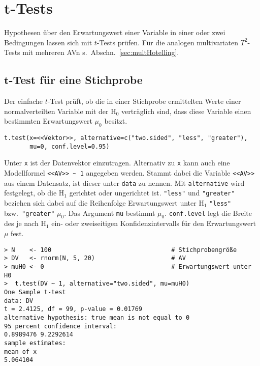 \section[\texorpdfstring{$t$}{t}-Tests]{$\bm{t}$-Tests}
\label{sec:tTest}

Hypothesen über den Erwartungswert einer Variable in einer oder zwei Bedingungen lassen sich mit $t$-Tests prüfen. Für die analogen multivariaten $T^{2}$-Tests mit mehreren AVn s.\ Abschn.\ \ref{sec:multHotelling}.

\subsection[\texorpdfstring{$t$}{t}-Test für eine Stichprobe]{$\bm{t}$-Test für eine Stichprobe}
\label{sec:tOne}

Der einfache $t$-Test prüft, ob die in einer Stichprobe ermittelten Werte einer normalverteilten Variable mit der $\text{H}_{0}$ verträglich sind, dass diese Variable einen bestimmten Erwartungswert $\mu_{0}$ besitzt.
\begin{lstlisting}
t.test(x=<<Vektor>>, alternative=c("two.sided", "less", "greater"),
       mu=0, conf.level=0.95)
\end{lstlisting}

Unter \lstinline!x! ist der Datenvektor einzutragen. Alternativ zu \lstinline!x! kann auch eine Modellformel \lstinline!<<AV>> ~ 1! angegeben werden. Stammt dabei die Variable \lstinline!<<AV>>! aus einem Datensatz, ist dieser unter \lstinline!data! zu nennen. Mit \lstinline!alternative! wird festgelegt, ob die $\text{H}_{1}$ gerichtet oder ungerichtet ist. \lstinline!"less"! und \lstinline!"greater"! beziehen sich dabei auf die Reihenfolge Erwartungswert unter $\text{H}_{1}$ \lstinline!"less"! bzw.\ \lstinline!"greater"! $\mu_{0}$. Das Argument \lstinline!mu! bestimmt $\mu_{0}$. \lstinline!conf.level! legt die Breite des je nach $\text{H}_{1}$ ein- oder zweiseitigen Konfidenzintervalls für den Erwartungswert $\mu$ fest.
\begin{lstlisting}
> N    <- 100                                 # Stichprobengröße
> DV   <- rnorm(N, 5, 20)                     # AV
> muH0 <- 0                                   # Erwartungswert unter H0
>  t.test(DV ~ 1, alternative="two.sided", mu=muH0)
One Sample t-test
data: DV
t = 2.4125, df = 99, p-value = 0.01769
alternative hypothesis: true mean is not equal to 0
95 percent confidence interval:
0.8989476 9.2292614
sample estimates:
mean of x
5.064104
\end{lstlisting}

